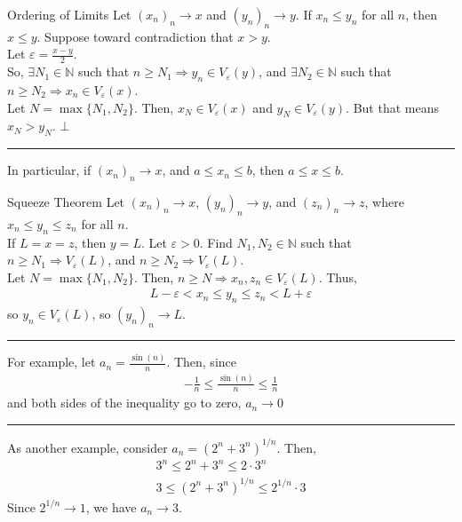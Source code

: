 \documentclass[8pt]{extarticle}
\newcommand{\N}{\mathbb{N}}
\begin{document}
  \begin{problem}{Ordering of Limits}
    Let $(x_n)_n \rightarrow x$ and $(y_n)_n \rightarrow y$. If $x_n \leq y_n$ for all $n$, then $x \leq y$.
    \tcblower
    Suppose toward contradiction that $x > y$.\\
    
    Let $\varepsilon = \frac{x-y}{2}$.\\

    So, $\exists N_1\in\N$ such that $n\geq N_1 \Rightarrow y_n\in V_{\varepsilon}(y)$, and $\exists N_2\in\N$ such that $n\geq N_2 \Rightarrow x_n\in V_{\varepsilon}(x)$.\\
    
    Let $N = \max\{N_1,N_2\}$. Then, $x_N\in V_{\varepsilon}(x)$ and $y_N\in V_{\varepsilon}(y)$. But that means $x_N > y_N$. $\bot$
    \vspace{4pt}
    \rule{\textwidth}{0.4pt}
    \vspace{4pt}
    In particular, if $(x_n)_n \rightarrow x$, and $a \leq x_n \leq b$, then $a\leq x \leq b$.
  \end{problem}
  \begin{problem}{Squeeze Theorem}
    Let $(x_n)_n \rightarrow x$, $(y_n)_n\rightarrow y$, and $(z_n)_n \rightarrow z$, where $x_n \leq y_n \leq z_n$ for all $n$.\\

    If $L = x = z$, then $y = L$.
    \tcblower
    Let $\varepsilon > 0$. Find $N_1,N_2\in\N$ such that $n\geq N_1 \Rightarrow V_{\varepsilon}(L)$, and $n\geq N_{2} \Rightarrow V_{\varepsilon}(L)$.\\

    Let $N = \max\{N_1,N_2\}$. Then, $n\geq N \Rightarrow x_n,z_n\in V_{\varepsilon}(L)$. Thus,
    \begin{align*}
      L-\varepsilon < x_n \leq y_n \leq z_n < L + \varepsilon
    \end{align*}
    so $y_n\in V_{\varepsilon}(L)$, so $(y_n)_n \rightarrow L$.\\
    \vspace{4pt}
    \rule{\textwidth}{0.4pt}
    \vspace{4pt}
    For example, let $a_n = \frac{\sin(n)}{n}$. Then, since
    \begin{align*}
      -\frac{1}{n} \leq \frac{\sin(n)}{n} \leq \frac{1}{n}
    \end{align*}
    and both sides of the inequality go to zero, $a_n \rightarrow 0$\\
    \vspace{4pt}
    \rule{\textwidth}{0.4pt}
    \vspace{4pt}
    As another example, consider $a_n = \left(2^n + 3^n\right)^{1/n}$. Then,
    \begin{align*}
      3^n \leq 2^n + 3^n \leq 2\cdot 3^n\\
      3 \leq \left(2^n + 3^n\right)^{1/n} \leq 2^{1/n}\cdot 3
    \end{align*}
    Since $2^{1/n} \rightarrow 1$, we have $a_n \rightarrow 3$.
  \end{problem}
\end{document}
